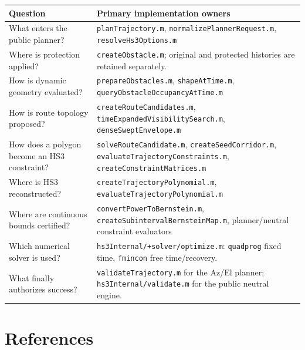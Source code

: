 \documentclass[10pt,letterpaper]{article}
\newcommand{\file}[1]{\nolinkurl{#1}}
\begin{document}
\begin{longtable}{@{}p{.28\linewidth}p{.64\linewidth}@{}}
\toprule
Question & Primary implementation owners \\
\midrule
\endhead
What enters the public planner? & \file{planTrajectory.m},
\file{normalizePlannerRequest.m}, \file{resolveHs3Options.m} \\
Where is protection applied? & \file{createObstacle.m}; original and protected
histories are retained separately. \\
How is dynamic geometry evaluated? & \file{prepareObstacles.m},
\file{shapeAtTime.m}, \file{queryObstacleOccupancyAtTime.m} \\
How is route topology proposed? & \file{createRouteCandidates.m},
\file{timeExpandedVisibilitySearch.m}, \file{denseSweptEnvelope.m} \\
How does a polygon become an HS3 constraint? &
\file{solveRouteCandidate.m}, \file{createSeedCorridor.m},
\file{evaluateTrajectoryConstraints.m}, \file{createConstraintMatrices.m} \\
Where is HS3 reconstructed? & \file{createTrajectoryPolynomial.m},
\file{evaluateTrajectoryPolynomial.m} \\
Where are continuous bounds certified? & \file{convertPowerToBernstein.m},
\file{createSubintervalBernsteinMap.m}, planner/neutral constraint evaluators \\
Which numerical solver is used? & \file{hs3Internal/+solver/optimize.m}:
\file{quadprog} fixed time, \file{fmincon} free time/recovery. \\
What finally authorizes success? & \file{validateTrajectory.m} for the Az/El
planner; \file{hs3Internal/validate.m} for the public neutral engine. \\
\bottomrule
\end{longtable}

\section{References}
\end{document}
